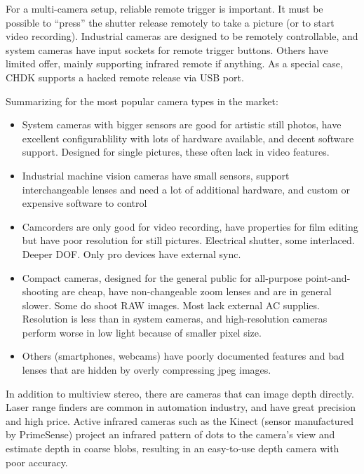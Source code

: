 For a multi-camera setup, reliable remote trigger is important.
It must be possible to ``press'' the shutter release remotely to take a picture (or to start video recording).
Industrial cameras are designed to be remotely controllable, and system cameras have input sockets for remote trigger buttons.
Others have limited offer, mainly supporting infrared remote if anything.
As a special case, CHDK supports a hacked remote release via USB port.


Summarizing for the most popular camera types in the market:

\begin{itemize}
	\item System cameras with bigger sensors are good for artistic still photos, have excellent configurablility with lots of hardware available, and decent software support. Designed for single pictures, these often lack in video features.
	\item Industrial machine vision cameras have small sensors, support interchangeable lenses and need a lot of additional hardware, and custom or expensive software to control
	\item Camcorders are only good for video recording, have properties for film editing but have poor resolution for still pictures. Electrical shutter, some interlaced. Deeper DOF. Only pro devices have external sync.
	\item Compact cameras, designed for the general public for all-purpose point-and-shooting are cheap, have non-changeable zoom lenses and are in general slower. Some do shoot RAW images. Most lack external AC supplies. Resolution is less than in system cameras, and high-resolution cameras perform worse in low light because of smaller pixel size.
	\item Others (smartphones, webcams) have poorly documented features and bad lenses that are hidden by overly compressing jpeg images.
\end{itemize}

In addition to multiview stereo, there are cameras that can image depth directly.
Laser range finders are common in automation industry, and have great precision and high price.
Active infrared cameras such as the Kinect (sensor manufactured by PrimeSense) project an infrared pattern of dots to the camera's view and estimate depth in coarse blobs, resulting in an easy-to-use depth camera with poor accuracy.


